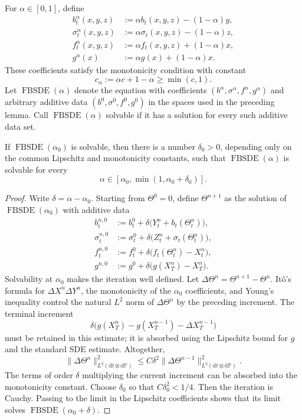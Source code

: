 For $\alpha\in[0,1]$, define
\[
\begin{aligned}
  b_t^\alpha(x,y,z)&:=\alpha b_t(x,y,z)-(1-\alpha)y,\\
  \sigma_t^\alpha(x,y,z)&:=\alpha\sigma_t(x,y,z)-(1-\alpha)z,\\
  f_t^\alpha(x,y,z)&:=\alpha f_t(x,y,z)+(1-\alpha)x,\\
  g^\alpha(x)&:=\alpha g(x)+(1-\alpha)x.
\end{aligned}
\]
These coefficients satisfy the monotonicity condition with constant
\[
  c_\alpha:=\alpha c+1-\alpha\ge\min(c,1).
\]
Let $\operatorname{FBSDE}(\alpha)$ denote the equation with coefficients
$(b^\alpha,\sigma^\alpha,f^\alpha,g^\alpha)$ and arbitrary additive data
$(b^0,\sigma^0,f^0,g^0)$ in the spaces used in the preceding lemma.
Call $\operatorname{FBSDE}(\alpha)$ solvable if it has a solution for
every such additive data set.

\begin{lem}
If $\operatorname{FBSDE}(\alpha_0)$ is solvable, then there is a number
$\delta_0>0$, depending only on the common Lipschitz and monotonicity
constants, such that
$\operatorname{FBSDE}(\alpha)$ is solvable for every
\[
  \alpha\in[\alpha_0,\min(1,\alpha_0+\delta_0)].
\]
\end{lem}

\begin{proof}
Write $\delta=\alpha-\alpha_0$.  Starting from $\Theta^0=0$, define
$\Theta^{n+1}$ as the solution of
$\operatorname{FBSDE}(\alpha_0)$ with additive data
\[
\begin{aligned}
  b_t^{n,0}&:=b_t^0+\delta\bigl(Y_t^n+b_t(\Theta_t^n)\bigr),\\
  \sigma_t^{n,0}&:=\sigma_t^0+\delta\bigl(Z_t^n+\sigma_t(\Theta_t^n)\bigr),\\
  f_t^{n,0}&:=f_t^0+\delta\bigl(f_t(\Theta_t^n)-X_t^n\bigr),\\
  g^{n,0}&:=g^0+\delta\bigl(g(X_T^n)-X_T^n\bigr).
\end{aligned}
\]
Solvability at $\alpha_0$ makes the iteration well defined.  Let
$\Delta\Theta^n=\Theta^{n+1}-\Theta^n$.  It\^o's formula for
$\Delta X^n\Delta Y^n$, the monotonicity of the
$\alpha_0$ coefficients, and Young's inequality control the natural
$L^2$ norm of $\Delta\Theta^n$ by the preceding increment.  The terminal
increment
\[
  \delta\bigl(
    g(X_T^n)-g(X_T^{n-1})-\Delta X_T^{n-1}
  \bigr)
\]
must be retained in this estimate; it is absorbed using the Lipschitz
bound for $g$ and the standard SDE estimate.  Altogether,
\[
  \|\Delta\Theta^n\|_{L^2(\mathrm dt\otimes\mathrm d\mathbb P)}^2
  \le C\delta^2
    \|\Delta\Theta^{n-1}\|_{L^2(\mathrm dt\otimes\mathrm d\mathbb P)}^2.
\]
The terms of order $\delta$ multiplying the current increment can be
absorbed into the monotonicity constant.  Choose $\delta_0$ so that
$C\delta_0^2<1/4$.  Then the iteration is Cauchy.  Passing to the limit
in the Lipschitz coefficients shows that its limit solves
$\operatorname{FBSDE}(\alpha_0+\delta)$.
\end{proof}

